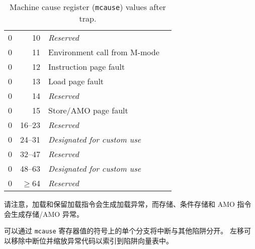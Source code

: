 \begin{table*}[htbp]
\begin{center}
\begin{tabular}{|r|r|l|l|}
  0         & 10              & {\em Reserved} \\
  0         & 11              & Environment call from M-mode \\
  0         & 12              & Instruction page fault \\
  0         & 13              & Load page fault \\
  0         & 14              & {\em Reserved} \\
  0         & 15              & Store/AMO page fault \\
  0         & 16--23          & {\em Reserved} \\
  0         & 24--31          & {\em Designated for custom use} \\
  0         & 32--47          & {\em Reserved} \\
  0         & 48--63          & {\em Designated for custom use} \\
  0         & $\ge$64         & {\em Reserved} \\
  \hline

\end{tabular}
\end{center}
\caption{Machine cause register ({\tt mcause}) values after trap.}
\label{mcauses}
\end{table*}

\iffalse
Note that load and load-reserved instructions generate load exceptions,
whereas store, store-conditional, and AMO instructions generate store/AMO
exceptions.
\fi
请注意，加载和保留加载指令会生成加载异常，而存储、条件存储和 AMO 指令会生成存储/AMO 异常。

\iffalse
\begin{commentary}
Interrupts can be separated from other traps with a single branch on the sign of
the {\tt mcause} register value.  A shift left can remove the
interrupt bit and scale the exception codes to index into a trap
vector table.
\end{commentary}
\fi

\begin{commentary}
可以通过 {\tt mcause} 寄存器值的符号上的单个分支将中断与其他陷阱分开。 左移可以移除中断位并缩放异常代码以索引到陷阱向量表中。
\end{commentary}

\iffalse
\begin{commentary}
We do not distinguish privileged instruction exceptions from illegal
opcode exceptions.  This simplifies the architecture and also hides
details of which higher-privilege instructions are supported by an
implementation.  The privilege level servicing the trap can implement
a policy on whether these need to be distinguished, and if so, whether
a given opcode should be treated as illegal or privileged.
\end{commentary}
\fi

